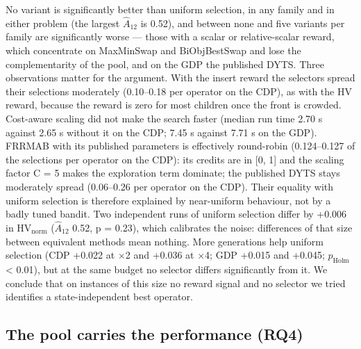 No variant is significantly better than uniform selection, in any family and in either problem (the largest $\hat{A}_{12}$ is 0.52), and between none and five variants per family are significantly worse --- those with a scalar or relative-scalar reward, which concentrate on MaxMinSwap and BiObjBestSwap and lose the complementarity of the pool, and on the GDP the published DYTS. Three observations matter for the argument. With the insert reward the selectors spread their selections moderately (0.10--0.18 per operator on the CDP), as with the HV reward, because the reward is zero for most children once the front is crowded. Cost-aware scaling did not make the search faster (median run time 2.70 s against 2.65 s without it on the CDP; 7.45 s against 7.71 s on the GDP). FRRMAB with its published parameters is effectively round-robin (0.124--0.127 of the selections per operator on the CDP): its credits are in [0, 1] and the scaling factor C = 5 makes the exploration term dominate; the published DYTS stays moderately spread (0.06--0.26 per operator on the CDP). Their equality with uniform selection is therefore explained by near-uniform behaviour, not by a badly tuned bandit. Two independent runs of uniform selection differ by +0.006 in $\mathrm{HV}_{\mathrm{norm}}$ ($\hat{A}_{12}$ 0.52, p = 0.23), which calibrates the noise: differences of that size between equivalent methods mean nothing. More generations help uniform selection (CDP +0.022 at $\times$2 and +0.036 at $\times$4; GDP +0.015 and +0.045; $p_{\mathrm{Holm}}$ < 0.01), but at the same budget no selector differs significantly from it. We conclude that on instances of this size no reward signal and no selector we tried identifies a state-independent best operator.

\subsection{The pool carries the performance (RQ4)}\label{sec:the_pool_carries_the_perform}


